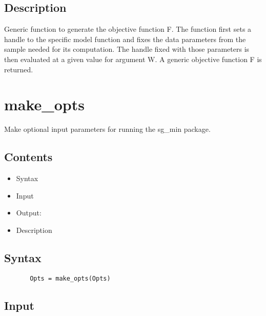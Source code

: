 \documentclass[a4paper,11pt,openany]{memoir}
\begin{document}
\subsection*{Description}

\begin{par}
Generic function to generate the objective function F. The function first sets a handle to the specific model function and fixes the data parameters from the sample needed for its computation. The handle fixed with those parameters is then evaluated at a given value for argument W. A generic objective function F is returned.
\end{par} \vspace{1em}

\newpage 

\rmfamily
\color{black}\section{make\_opts}

\begin{par}
Make optional input parameters for running the sg\_min package.
\end{par} \vspace{1em}

\subsection*{Contents}

\begin{itemize}
\setlength{\itemsep}{-1ex}
   \item Syntax
   \item Input
   \item Output:
   \item Description
\end{itemize}


\subsection*{Syntax}


\begin{verbatim}       Opts = make_opts(Opts)\end{verbatim}
    

\subsection*{Input}
\end{document}
